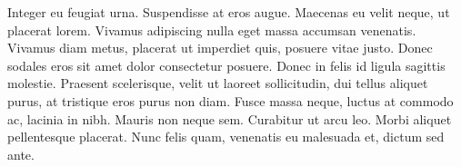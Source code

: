 Integer eu feugiat urna. Suspendisse at eros augue. Maecenas eu velit neque, ut placerat lorem. Vivamus adipiscing nulla eget massa accumsan venenatis. Vivamus diam metus, placerat ut imperdiet quis, posuere vitae justo. Donec sodales eros sit amet dolor consectetur posuere. Donec in felis id ligula sagittis molestie. Praesent scelerisque, velit ut laoreet sollicitudin, dui tellus aliquet purus, at tristique eros purus non diam. Fusce massa neque, luctus at commodo ac, lacinia in nibh. Mauris non neque sem. Curabitur ut arcu leo. Morbi aliquet pellentesque placerat. Nunc felis quam, venenatis eu malesuada et, dictum sed ante.
